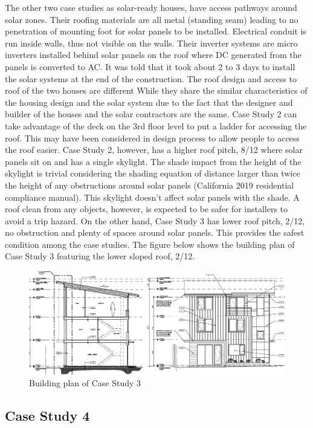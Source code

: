 \documentclass[]{article}
\begin{document}
The other two case studies as solar-ready houses, have access pathways
around solar zones. Their roofing materials are all metal (standing
seam) leading to no penetration of mounting foot for solar panels to be
installed. Electrical conduit is run inside walls, thus not visible on
the walls. Their inverter systems are micro inverters installed behind
solar panels on the roof where DC generated from the panels is converted
to AC. It was told that it took about 2 to 3 days to install the solar
systems at the end of the construction. The roof design and access to
roof of the two houses are different While they share the similar
characteristics of the housing design and the solar system due to the
fact that the designer and builder of the houses and the solar
contractors are the same. Case Study 2 can take advantage of the deck on
the 3rd floor level to put a ladder for accessing the roof. This may
have been considered in design process to allow people to access the
roof easier. Case Study 2, however, has a higher roof pitch, 8/12 where
solar panels sit on and has a single skylight. The shade impact from the
height of the skylight is trivial considering the shading equation of
distance larger than twice the height of any obstructions around solar
panels (California 2019 residential compliance manual). This skylight
doesn't affect solar panels with the shade. A roof clean from any
objects, however, is expected to be safer for installers to avoid a trip
hazard. On the other hand, Case Study 3 has lower roof pitch, 2/12, no
obstruction and plenty of spaces around solar panels. This provides the
safest condition among the case studies. The figure below shows the
building plan of Case Study 3 featuring the lower sloped roof, 2/12.

\begin{figure}
\centering
\includegraphics{case3.png}
\caption{Building plan of Case Study 3}
\end{figure}

\hypertarget{case-study-4}{%
\subsection{Case Study 4}\label{case-study-4}}
\end{document}
